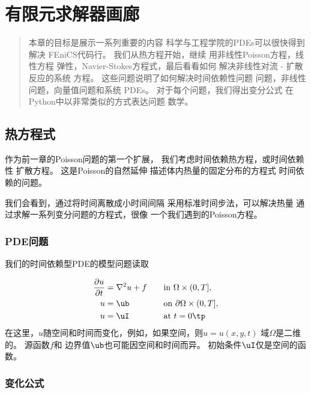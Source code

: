 \chapter{有限元求解器画廊}
\label{ch:gallery}

\begin{quote}
本章的目标是展示一系列重要的内容
科学与工程学院的PDEs可以很快得到解决
FEniCS代码行。 我们从热方程开始，继续
用非线性Poisson方程，线性方程
弹性，Navier-Stokes方程式，最后看看如何
解决非线性对流 - 扩散反应的系统
方程。 这些问题说明了如何解决时间依赖性问题
问题，非线性问题，向量值问题和系统
PDEs。 对于每个问题，我们得出变分公式
在Python中以非常类似的方式表达问题
数学。
\end{quote}

\section{热方程式}
\label{ch:fundamentals:diffusion}


作为前一章的Poisson问题的第一个扩展，
我们考虑时间依赖热方程，或时间依赖性
扩散方程。 这是Poisson的自然延伸
描述体内热量的固定分布的方程式
时间依赖的问题。

我们会看到，通过将时间离散成小时间间隔
采用标准时间步法，可以解决热量
通过求解一系列变分问题的方程式，很像
一个我们遇到的Poisson方程。

\subsection{PDE问题}

我们的时间依赖型PDE的模型问题读取

\begin{alignat}{2}
{\partial u\over\partial t} &= \nabla^2 u + f \quad &&\hbox{in }\Omega\times(0, T],
\label{ch:diffusion0:pde1}\\
u &= \ub &&\hbox{on } \partial \Omega\times(0, T],
\label{ch:diffusion0:pde1:bc}\\
u &= \uI &&\mbox{at } t=0\tp
\label{ch:diffusion0:pde1:ic}
\end{alignat}
在这里，$u$随空间和时间而变化，例如，如果空间，则$u=u(x,y,t)$
域$\Omega$是二维的。 源函数$f$和
边界值$\ub$也可能因空间和时间而异。
初始条件$\uI$仅是空间的函数。

\subsection{变化公式}
\label{ftut:timedep:diffusion1}

